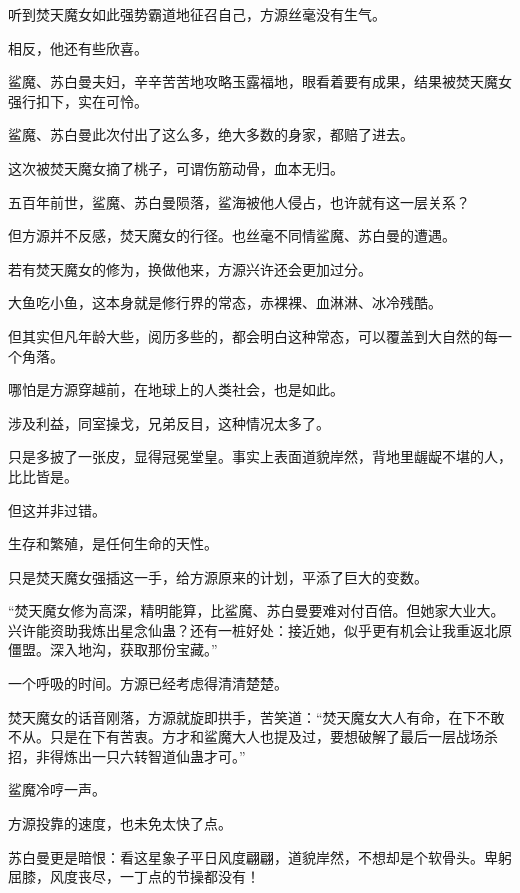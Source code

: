 
\begin{this_body}

听到焚天魔女如此强势霸道地征召自己，方源丝毫没有生气。

相反，他还有些欣喜。

鲨魔、苏白曼夫妇，辛辛苦苦地攻略玉露福地，眼看着要有成果，结果被焚天魔女强行扣下，实在可怜。

鲨魔、苏白曼此次付出了这么多，绝大多数的身家，都赔了进去。

这次被焚天魔女摘了桃子，可谓伤筋动骨，血本无归。

五百年前世，鲨魔、苏白曼陨落，鲨海被他人侵占，也许就有这一层关系？

但方源并不反感，焚天魔女的行径。也丝毫不同情鲨魔、苏白曼的遭遇。

若有焚天魔女的修为，换做他来，方源兴许还会更加过分。

大鱼吃小鱼，这本身就是修行界的常态，赤裸裸、血淋淋、冰冷残酷。

但其实但凡年龄大些，阅历多些的，都会明白这种常态，可以覆盖到大自然的每一个角落。

哪怕是方源穿越前，在地球上的人类社会，也是如此。

涉及利益，同室操戈，兄弟反目，这种情况太多了。

只是多披了一张皮，显得冠冕堂皇。事实上表面道貌岸然，背地里龌龊不堪的人，比比皆是。

但这并非过错。

生存和繁殖，是任何生命的天性。

只是焚天魔女强插这一手，给方源原来的计划，平添了巨大的变数。

“焚天魔女修为高深，精明能算，比鲨魔、苏白曼要难对付百倍。但她家大业大。兴许能资助我炼出星念仙蛊？还有一桩好处：接近她，似乎更有机会让我重返北原僵盟。深入地沟，获取那份宝藏。”

一个呼吸的时间。方源已经考虑得清清楚楚。

焚天魔女的话音刚落，方源就旋即拱手，苦笑道：“焚天魔女大人有命，在下不敢不从。只是在下有苦衷。方才和鲨魔大人也提及过，要想破解了最后一层战场杀招，非得炼出一只六转智道仙蛊才可。”

鲨魔冷哼一声。

方源投靠的速度，也未免太快了点。

苏白曼更是暗恨：看这星象子平日风度翩翩，道貌岸然，不想却是个软骨头。卑躬屈膝，风度丧尽，一丁点的节操都没有！


\end{this_body}

